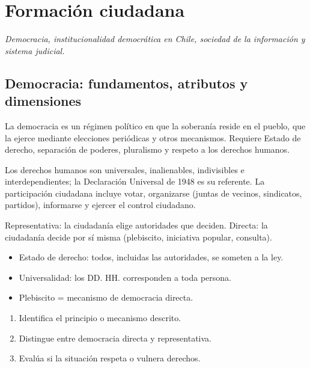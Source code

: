 \documentclass[10pt,a4paper,twocolumn]{article}
\begin{document}
\section{Formación ciudadana}

{\itshape\color{zinc700} Democracia, institucionalidad democrática en Chile, sociedad de la información y sistema judicial.}

\subsection{Democracia: fundamentos, atributos y dimensiones}

La democracia es un régimen político en que la soberanía reside en el pueblo, que la ejerce mediante elecciones periódicas y otros mecanismos. Requiere Estado de derecho, separación de poderes, pluralismo y respeto a los derechos humanos.

Los derechos humanos son universales, inalienables, indivisibles e interdependientes; la Declaración Universal de 1948 es su referente. La participación ciudadana incluye votar, organizarse (juntas de vecinos, sindicatos, partidos), informarse y ejercer el control ciudadano.

\begin{definicion}
Representativa: la ciudadanía elige autoridades que deciden. Directa: la ciudadanía decide por sí misma (plebiscito, iniciativa popular, consulta).
\end{definicion}

\begin{ideasclave}
\begin{itemize}
  \item Estado de derecho: todos, incluidas las autoridades, se someten a la ley.
  \item Universalidad: los DD. HH. corresponden a toda persona.
  \item Plebiscito = mecanismo de democracia directa.
\end{itemize}
\end{ideasclave}

\begin{metodo}
\begin{enumerate}
  \item Identifica el principio o mecanismo descrito.
  \item Distingue entre democracia directa y representativa.
  \item Evalúa si la situación respeta o vulnera derechos.
\end{enumerate}
\end{metodo}
\end{document}
